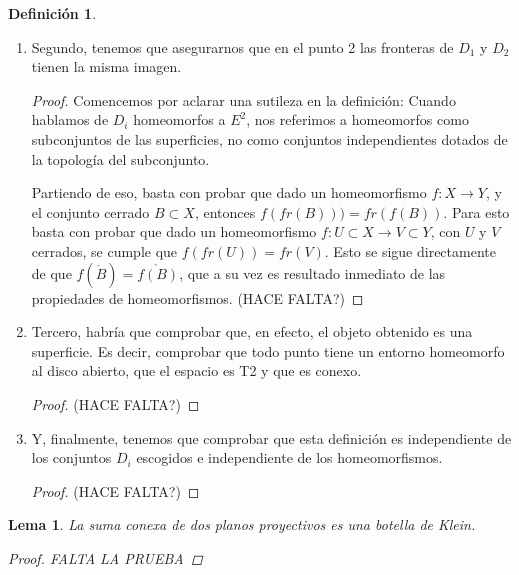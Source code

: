 \documentclass[a4paper,11pt,spanish, twoside, leqno]{tfg-uam}
\newtheorem{lema}[teor]{Lema}
\theoremstyle{definition}
\newtheorem{defin}[teor]{Definici\'on}
\begin{document}
\begin{defin}
\begin{enumerate}
\begin{proof}
			Tomamos $E_{\frac{1}{2}}$ el disco cerrado de radio $\frac{1}{2}$, y $U'= g^{-1}(E_{\frac{1}{2}})$. Tenemos que $g\mid_{U'}$ es un homeomorfismo de un subconjunto de $S_i$ a $E_{\frac{1}{2}}$ que a su vez es homeomorfo al disco cerrado de radio 1. (HACE FALTA?)
		\end{proof} 
		\item 
		Segundo, tenemos que asegurarnos que en el punto 2 las fronteras de $D_1$ y $D_2$ tienen la misma imagen.
		\begin{proof}
			Comencemos por aclarar una sutileza en la definición: Cuando hablamos de $D_i$ homeomorfos a $E^2$, nos referimos a homeomorfos como subconjuntos de las superficies, no como conjuntos independientes dotados de la topología del subconjunto.
			
			Partiendo de eso, basta con probar que dado un homeomorfismo $f: X\longrightarrow Y$, y el conjunto cerrado $B\subset X$, entonces $f(fr(B)))= fr(f(B))$.
			Para esto basta con probar que dado un homeomorfismo $f: U\subset X \longrightarrow V\subset Y$, con $U$ y $V$ cerrados, se cumple que $f(fr(U)) = fr(V)$. Esto se sigue directamente de que $f(\mathring{B})=\mathring{f(B)}$, que a su vez es resultado inmediato de las propiedades de homeomorfismos. (HACE FALTA?)
		\end{proof}
		\item 
		Tercero, habría que comprobar que, en efecto, el objeto obtenido es una superficie. Es decir, comprobar que todo punto tiene un entorno homeomorfo al disco abierto, que el espacio es T2 y que es conexo.
		\begin{proof}
			
			(HACE FALTA?)
		\end{proof}
		\item 
		Y, finalmente, tenemos que comprobar que esta definición es independiente de los conjuntos $D_i$ escogidos e independiente de los homeomorfismos.
		\begin{proof}
			(HACE FALTA?)
		\end{proof}
	\end{enumerate} 
\end{defin}

\begin{lema}\label{lema:sumadedosplanosproyectivos}
	La suma conexa de dos planos proyectivos es una botella de Klein.
	\begin{proof}
		FALTA LA PRUEBA
	\end{proof}
\end{lema}
\end{document}
